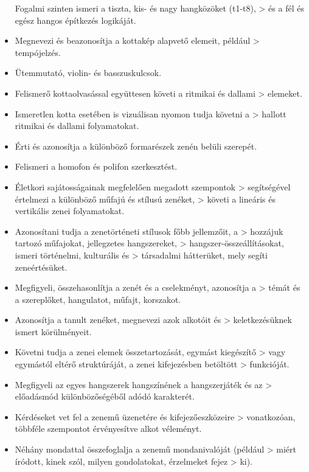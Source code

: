 \begin{itemize}
  Fogalmi szinten ismeri a tiszta, kis- és nagy hangközöket (t1-t8),
  \textgreater{} és a fél és egész hangos építkezés logikáját.
\item
  Megnevezi és beazonosítja a kottakép alapvető elemeit, például
  \textgreater{} tempójelzés.
\item
  Ütemmutató, violin- és basszuskulcsok.
\item
  Felismerő kottaolvasással együttesen követi a ritmikai és dallami
  \textgreater{} elemeket.
\item
  Ismeretlen kotta esetében is vizuálisan nyomon tudja követni a
  \textgreater{} hallott ritmikai és dallami folyamatokat.
\item
  Érti és azonosítja a különböző formarészek zenén belüli szerepét.
\item
  Felismeri a homofon és polifon szerkesztést.
\item
  Életkori sajátosságainak megfelelően megadott szempontok
  \textgreater{} segítségével értelmezi a különböző műfajú és stílusú
  zenéket, \textgreater{} követi a lineáris és vertikális zenei
  folyamatokat.
\item
  Azonosítani tudja a zenetörténeti stílusok főbb jellemzőit, a
  \textgreater{} hozzájuk tartozó műfajokat, jellegzetes hangszereket,
  \textgreater{} hangszer-összeállításokat, ismeri történelmi,
  kulturális és \textgreater{} társadalmi hátterüket, mely segíti
  zeneértésüket.
\item
  Megfigyeli, összehasonlítja a zenét és a cselekményt, azonosítja a
  \textgreater{} témát és a szereplőket, hangulatot, műfajt, korszakot.
\item
  Azonosítja a tanult zenéket, megnevezi azok alkotóit és \textgreater{}
  keletkezésüknek ismert körülményeit.
\item
  Követni tudja a zenei elemek összetartozását, egymást kiegészítő
  \textgreater{} vagy egymástól eltérő struktúráját, a zenei
  kifejezésben betöltött \textgreater{} funkcióját.
\item
  Megfigyeli az egyes hangszerek hangszínének a hangszerjáték és az
  \textgreater{} előadásmód különbözőségéből adódó karakterét.
\item
  Kérdéseket vet fel a zenemű üzenetére és kifejezőeszközeire
  \textgreater{} vonatkozóan, többféle szempontot érvényesítve alkot
  véleményt.
\item
  Néhány mondattal összefoglalja a zenemű mondanivalóját (például
  \textgreater{} miért íródott, kinek szól, milyen gondolatokat,
  érzelmeket fejez \textgreater{} ki).

\end{itemize}
